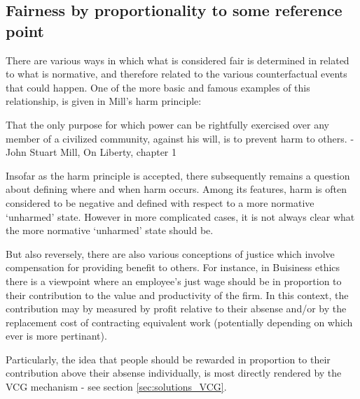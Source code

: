 \subsection{Fairness by proportionality to some reference point}\label{sec:reference_points}

There are various ways in which what is considered fair is determined in related to what is normative, and therefore related to the various counterfactual events that could happen.
One of the more basic and famous examples of this relationship, is given in Mill's harm principle:

\begin{displayquote}
That the only purpose for which power can be rightfully exercised over any member of a civilized community, against his will, is to prevent harm to others. - John Stuart Mill, On Liberty, chapter 1 \cite{Mill2Gutenberg}
\end{displayquote}

Insofar as the harm principle is accepted, there subsequently remains a question about defining where and when harm occurs.
Among its features, harm is often considered to be negative and defined with respect to a more normative `unharmed' state.
However in more complicated cases, it is not always clear what the more normative `unharmed' state should be.%

But also reversely, there are also various conceptions of justice which involve compensation for providing benefit to others.
For instance, in Buisiness ethics there is a viewpoint where an employee's just wage should be in proportion to their contribution to the value and productivity of the firm.\cite{sternberg2000just}
In this context, the contribution may by measured by profit relative to their absense and/or by the replacement cost of contracting equivalent work (potentially depending on which ever is more pertinant).

Particularly, the idea that people should be rewarded in proportion to their contribution above their absense individually, is most directly rendered by the VCG mechanism - see section \ref{sec:solutions_VCG}.


